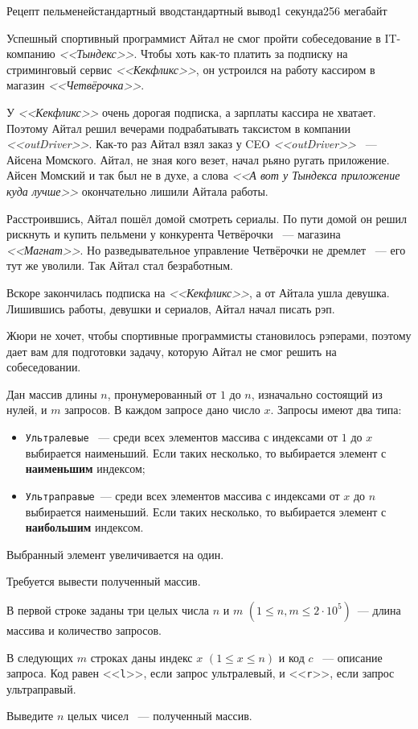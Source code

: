 \begin{problem}{Рецепт пельменей}{стандартный ввод}{стандартный вывод}{1 секунда}{256 мегабайт}

Успешный спортивный программист Айтал не смог пройти собеседование в IT-компанию \textit{<<Тындекс>>}. Чтобы хоть как-то платить за подписку на стриминговый сервис \textit{<<Кекфликс>>}, он устроился на работу кассиром в магазин \textit{<<Четвёрочка>>}.

У \textit{<<Кекфликс>>} очень дорогая подписка, а зарплаты кассира не хватает. Поэтому Айтал решил вечерами подрабатывать таксистом в компании \textit{<<outDriver>>}. Как-то раз Айтал взял заказ у CEO \textit{<<outDriver>>} ~--- Айсена Момского. Айтал, не зная кого везет, начал рьяно ругать приложение. Айсен Момский и так был не в духе, а слова \textit{<<А вот у Тындекса приложение куда лучше>>} окончательно лишили Айтала работы.

Расстроившись, Айтал пошёл домой смотреть сериалы. По пути домой он решил рискнуть и купить пельмени у конкурента Четвёрочки ~--- магазина \textit{<<Магнат>>}. Но разведывательное управление Четвёрочки не дремлет ~--- его тут же уволили. Так Айтал стал безработным. 

Вскоре закончилась подписка на \textit{<<Кекфликс>>}, а от Айтала ушла девушка. Лишившись работы, девушки и сериалов, Айтал начал писать рэп. 

Жюри не хочет, чтобы спортивные программисты становилось рэперами, поэтому дает вам для подготовки задачу, которую Айтал не смог решить на собеседовании.

Дан массив длины $n$, пронумерованный от $1$ до $n$, изначально состоящий из нулей, и $m$ запросов. В каждом запросе дано число $x$. Запросы имеют два типа:
\begin{itemize}
  \item \texttt{Ультралевые} ~--- среди всех элементов массива с индексами от $1$ до $x$ выбирается наименьший. Если таких несколько, то выбирается элемент с \textbf{наименьшим} индексом;
  \item \texttt{Ультраправые}~--- среди всех элементов массива с индексами от $x$ до $n$ выбирается наименьший. Если таких несколько, то выбирается элемент с \textbf{наибольшим} индексом.
\end{itemize}
Выбранный элемент увеличивается на один.

Требуется вывести полученный массив.

\InputFile
В первой строке заданы три целых числа $n$ и $m$ $(1 \le n, m \le 2 \cdot 10^5)$~--- длина массива и количество запросов.

В следующих $m$ строках даны индекс $x$ $(1 \le x \le n)$ и код $c$ ~--- описание запроса. Код равен <<\texttt{l}>>, если запрос ультралевый, и <<\texttt{r}>>, если запрос ультраправый.

\OutputFile
Выведите $n$ целых чисел ~--- полученный массив.

\Examples

\begin{example}
%
%
\end{example}

\end{problem}

